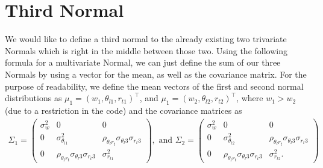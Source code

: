 \section{Third Normal}\label{sec:third_normal}

We would like to define a third normal to the already existing two trivariate Normals which is right in the middle between those two.
Using the following formula for a multivariate Normal, we can just define the sum of our three Normals by using a vector for the mean, as well as the covariance matrix.
For the purpose of readability, we define the mean vectors of the first and second normal distributions as $\mu_1 = (w_1, \theta_{l1}, r_{t1})^\top$, and $\mu_1 = (w_2, \theta_{l2}, r_{t2})^\top$, where $w_1 > w_2$ (due to a restriction in the code) and the covariance matrices as
\begin{align*}
    \Sigma_1 =
    \begin{pmatrix}
        \sigma_w^2 & 0                                                      & 0                                                      \\
        0          & \sigma_{\theta_{l1}}^2                                 & \rho_{\theta_l r_t} \sigma_{\theta_l 3} \sigma_{r_t 3} \\
        0          & \rho_{\theta_l r_t} \sigma_{\theta_l 3} \sigma_{r_t 3} & \sigma_{r_{t1}}^2
    \end{pmatrix},
    \text{ and }
    \Sigma_2 =
    \begin{pmatrix}
        \sigma_w^2 & 0                                                      & 0                                                      \\
        0          & \sigma_{\theta_{l2}}^2                                 & \rho_{\theta_l r_t} \sigma_{\theta_l 3} \sigma_{r_t 3} \\
        0          & \rho_{\theta_l r_t} \sigma_{\theta_l 3} \sigma_{r_t 3} & \sigma_{r_{t2}}^2.
    \end{pmatrix}
\end{align*}


